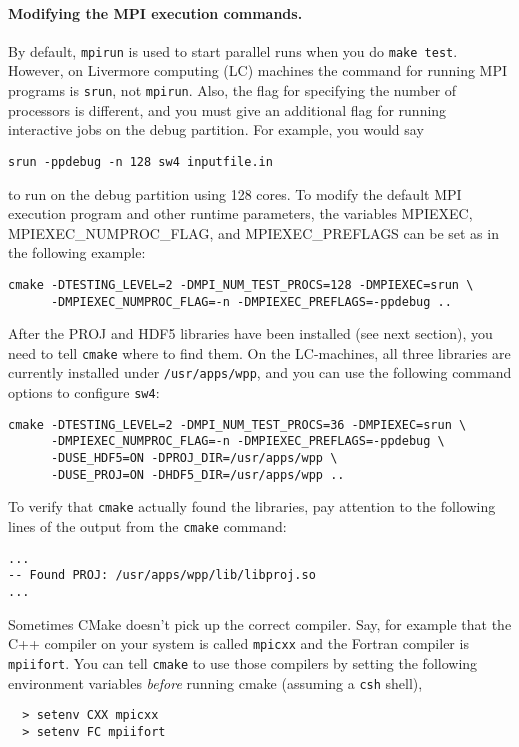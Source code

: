 \documentclass[11pt]{article}
\begin{document}
\paragraph{Modifying the MPI execution commands.}
By default, \verb+mpirun+ is used to start parallel runs when you do \verb+make test+.  However, on
Livermore computing (LC) machines the command for running MPI programs is \verb+srun+, not
\verb+mpirun+. Also, the flag for specifying the number of processors is different, and you must
give an additional flag for running interactive jobs on the debug partition. For example, you would
say
\begin{verbatim}
srun -ppdebug -n 128 sw4 inputfile.in
\end{verbatim}
to run on the debug partition using 128 cores. To modify the default MPI execution program and
other runtime parameters, the variables MPIEXEC, MPIEXEC\_NUMPROC\_FLAG, and
MPIEXEC\_PREFLAGS can be set as in the following example:
\begin{verbatim}
cmake -DTESTING_LEVEL=2 -DMPI_NUM_TEST_PROCS=128 -DMPIEXEC=srun \
      -DMPIEXEC_NUMPROC_FLAG=-n -DMPIEXEC_PREFLAGS=-ppdebug ..
\end{verbatim}

After the PROJ and HDF5 libraries have been installed (see next section), you need to tell
\verb+cmake+ where to find them. On the LC-machines, all three libraries are currently installed under
\verb+/usr/apps/wpp+, and you can use the following command options to configure \verb+sw4+:
\begin{verbatim}
cmake -DTESTING_LEVEL=2 -DMPI_NUM_TEST_PROCS=36 -DMPIEXEC=srun \
      -DMPIEXEC_NUMPROC_FLAG=-n -DMPIEXEC_PREFLAGS=-ppdebug \
      -DUSE_HDF5=ON -DPROJ_DIR=/usr/apps/wpp \
      -DUSE_PROJ=ON -DHDF5_DIR=/usr/apps/wpp ..
\end{verbatim}
To verify that \verb+cmake+ actually found the libraries, pay attention to the
following lines of the output from the \verb+cmake+ command:
\begin{verbatim}
...
-- Found PROJ: /usr/apps/wpp/lib/libproj.so  
...
\end{verbatim}

Sometimes CMake doesn't pick up the correct compiler. Say, for example that the C++ compiler on your
system is called {\tt mpicxx} and the Fortran compiler is {\tt mpiifort}. You can tell {\tt cmake}
to use those compilers by setting the following environment variables {\em before} running cmake
(assuming a {\tt csh} shell),
\begin{verbatim}
  > setenv CXX mpicxx
  > setenv FC mpiifort
\end{verbatim}
\end{document}
